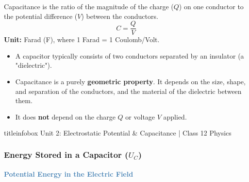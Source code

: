 \begin{frame}
\begin{frame}
\vspace{0.35cm}

\begin{formulabox}
\vspace{0.1cm}
Capacitance is the ratio of the magnitude of the charge ($Q$) on one conductor to the potential difference ($V$) between the conductors.
\begin{equation*}
\boxed{C = \frac{Q}{V}}
\end{equation*}
\textbf{Unit:} Farad (F), where 1 Farad = 1 Coulomb/Volt.
\vspace{0.1cm}
\end{formulabox}

\vspace{0.35cm}

\begin{importantbox}
\vspace{0.1cm}
\begin{itemize}
    \item A capacitor typically consists of two conductors separated by an insulator (a "dielectric").
    \item Capacitance is a purely \textbf{geometric property}. It depends on the size, shape, and separation of the conductors, and the material of the dielectric between them.
    \item It does \textbf{not} depend on the charge $Q$ or voltage $V$ applied.
\end{itemize}
\vspace{0.1cm}
\end{importantbox}

\vfill

\begin{beamercolorbox}[wd=\textwidth,ht=0.5cm,dp=0.1cm,center]{titleinfobox}
    \small\color{coolgray} Unit 2: Electrostatic Potential & Capacitance | Class 12 Physics
\end{beamercolorbox}
\end{frame}

\begin{frame}
\frametitle{\textsf{\textbf{Energy Stored in a Capacitor ($U_C$)}}}
\framesubtitle{\textcolor{steelblue}{Potential Energy in the Electric Field}}


\end{frame}
\end{frame}
